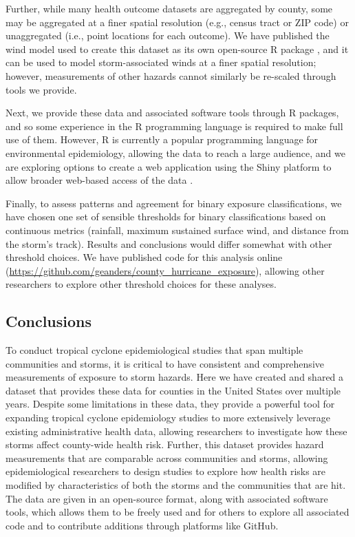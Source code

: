 Further, while many health outcome datasets are aggregated by county, 
some may be aggregated at a finer spatial resolution (e.g., census tract or ZIP
code) or unaggregated (i.e., point locations for each outcome). We have
published the wind model used to create this dataset as its own open-source R
package \parencite{stormwindmodel}, and it can be used to model
storm-associated winds at a finer spatial resolution; however, measurements of
other hazards cannot similarly be re-scaled through tools we provide. 

Next, we provide these data and associated software tools through R packages,
and so some experience in the R programming language is required to make full
use of them. However, R is currently a popular programming language for
environmental epidemiology, allowing the data to reach a large audience, and we
are exploring options to create a web application using the Shiny platform to
allow broader web-based access of the data \parencite{shiny2019}.  

Finally, to assess patterns and agreement for binary exposure classifications,
we have chosen one set of sensible thresholds for binary classifications based
on continuous metrics (rainfall, maximum sustained surface wind, and distance
from the storm's track).  Results and conclusions would differ somewhat with
other threshold choices. We have published code for this analysis online
(\url{https://github.com/geanders/county_hurricane_exposure}), allowing other
researchers to explore other threshold choices for these analyses.

\subsection*{Conclusions}

To conduct tropical cyclone epidemiological studies that span multiple
communities and storms, it is critical to have consistent and comprehensive
measurements of exposure to storm hazards. Here we have created and shared a
dataset that provides these data for counties in the United States over
multiple years. Despite some limitations in these data, they provide a powerful
tool for expanding tropical cyclone epidemiology studies to more extensively
leverage existing administrative health data, allowing researchers to
investigate how these storms affect county-wide health risk.  Further, this
dataset provides hazard measurements that are comparable across communities and
storms, allowing epidemiological researchers to design studies to explore
how health risks are modified by characteristics of both the storms and the
communities that are hit. The data are given in an open-source format, along
with associated software tools, which allows them to be freely used and for
others to explore all associated code and to contribute additions through
platforms like GitHub.

